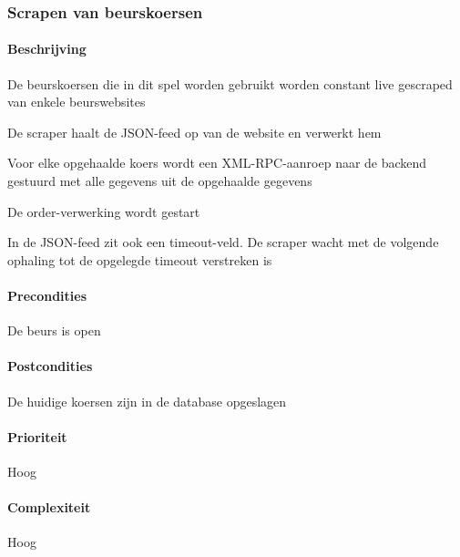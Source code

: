 \subsubsection{Scrapen van beurskoersen}
\begin{compact}
\paragraph{Beschrijving} De beurskoersen die in dit spel worden gebruikt worden constant live gescraped van enkele beurswebsites
\begin{itemize_compact}
	\item De scraper haalt de JSON-feed op van de website en verwerkt hem
  \item Voor elke opgehaalde koers wordt een XML-RPC-aanroep naar de backend gestuurd met alle gegevens uit de opgehaalde gegevens
  \item De order-verwerking wordt gestart
  \item In de JSON-feed zit ook een timeout-veld. De scraper wacht met de volgende ophaling tot de opgelegde timeout verstreken is
\end{itemize_compact}
\paragraph{Precondities} De beurs is open
\paragraph{Postcondities} De huidige koersen zijn in de database opgeslagen
\paragraph{Prioriteit}Hoog
\paragraph{Complexiteit}Hoog
\end{compact}

